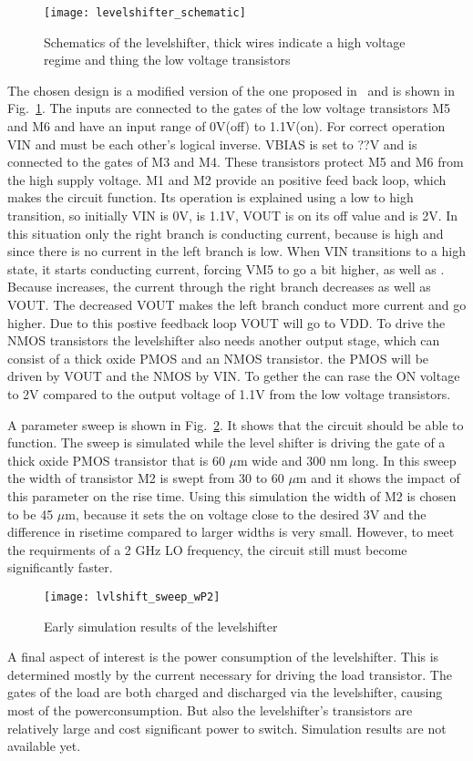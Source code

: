 \begin{figure}[h]
 \texttt{[image: levelshifter\_schematic]}
 \caption{Schematics of the levelshifter, thick wires indicate a high voltage regime and thing the low voltage transistors}
 \label{fig:schematic_levelshifter}
\end{figure}
The chosen design is a modified version of the one proposed in~\cite{powerdac} and is shown in Fig.~\ref{fig:schematic_levelshifter}. The inputs are connected to the gates of the low voltage transistors M5 and M6 and have an input range of 0V(off) to 1.1V(on). For correct operation VIN and  must be each other's logical inverse. VBIAS is set to ??V and is connected to the gates of M3 and M4. These transistors protect M5 and M6 from the high supply voltage. M1 and M2 provide an positive feed back loop, which makes the circuit function. Its operation is explained using a low to high transition, so initially VIN is 0V,  is 1.1V, VOUT is on its off value and  is 2V. In this situation only the right branch is conducting current, because  is high and since there is no current in the left branch  is low. When VIN transitions to a high state, it starts conducting current, forcing VM5 to go a bit higher, as well as . Because  increases, the current through the right branch decreases as well as VOUT. The decreased VOUT makes the left branch conduct more current and  go higher. Due to this postive feedback loop VOUT will go to VDD. To drive the NMOS transistors the levelshifter also needs another output stage, which can consist of a thick oxide PMOS and an NMOS transistor. the PMOS will be driven by VOUT and the NMOS by VIN. To gether the can rase the ON voltage to 2V compared to the output voltage of 1.1V from the low voltage transistors. 

A parameter sweep is shown in Fig.~\ref{fig:levelshifter_sweep}. It shows that the circuit should be able to function. The sweep is simulated while the level shifter is driving the gate of a thick oxide PMOS transistor that is 60 $\mu$m wide and 300 nm long. In this sweep the width of transistor M2 is swept from 30 to 60 $\mu$m and it shows the impact of this parameter on the rise time. Using this simulation the width of M2 is chosen to be 45 $\mu$m, because it sets the on voltage close to the desired 3V and the difference in risetime compared to larger widths is very small. However, to meet the requirments of a 2 GHz LO frequency, the circuit still must become significantly faster.
\begin{figure}[h]
 \texttt{[image: lvlshift\_sweep\_wP2]}
 \caption{Early simulation results of the levelshifter}
 \label{fig:levelshifter_sweep}
\end{figure}

A final aspect of interest is the power consumption of the levelshifter. This is determined mostly by the current necessary for driving the load transistor. The gates of the load are both charged and discharged via the levelshifter, causing most of the powerconsumption. But also the levelshifter's transistors are relatively large and cost significant power to switch. Simulation results are not available yet. 